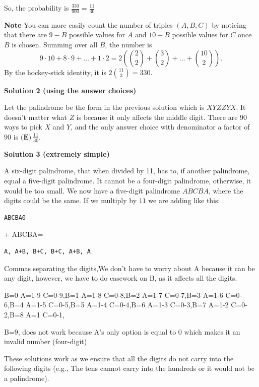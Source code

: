 \begin{enumerate}
 So, the probability is $\frac{330}{900} = \frac{11}{30}$

 \textbf{Note} You can more easily count the number of triples $(A, B, C)$ by noticing that there are $9 - B$ possible values for $A$ and $10 - B$ possible values for $C$ once $B$ is chosen. Summing over all $B$, the number is 
 \[9\cdot 10 + 8\cdot 9 + \ldots + 1\cdot 2 = 2\left(\binom{2}{2} + \binom{3}{2} + \ldots + \binom{10}{2}\right).\]By the hockey-stick identity, it is $2\binom{11}{3} = 330$.

 



\textbf{Solution 2 (using the answer choices)}

Let the palindrome be the form in the previous solution which is $XYZZYX$. It doesn't matter what $Z$ is because it only affects the middle digit. There are $90$ ways to pick $X$ and $Y$, and the only answer choice with denominator a factor of $90$ is $\boxed{\textbf{(E)} \ \frac{11}{30}}$.

 



\textbf{Solution 3 (extremely simple)}

A six-digit palindrome, that when divided by 11, has to, if another palindrome, equal a five-digit palindrome. It cannot be a four-digit palindrome, otherwise, it would be too small. We now have a five-digit palindrome $ABCBA$, where the digits could be the same. If we multiply by $11$ we are adding like this:

 \begin{verbatim}
ABCBA0
\end{verbatim}

+ ABCBA=

 \begin{verbatim}
A, A+B, B+C, B+C, A+B, A
\end{verbatim}

Commas separating the digits,We don't have to worry about A because it can be any digit, however, we have to do casework on B, as it affects all the digits.

 B=0 A=1-9 C=0-9,B=1 A=1-8 C=0-8,B=2 A=1-7 C=0-7,B=3 A=1-6 C=0-6,B=4 A=1-5 C=0-5,B=5 A=1-4 C=0-4,B=6 A=1-3 C=0-3,B=7 A=1-2 C=0-2,B=8 A=1   C=0-1,

 B=9, does not work because A's only option is equal to 0 which makes it an invalid number (four-digit)

 These solutions work as we ensure that all the digits do not carry into the following digits (e.g., The tens cannot carry into the hundreds or it would not be a palindrome).


\end{enumerate}
